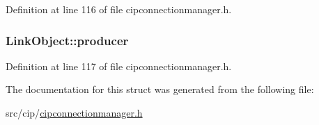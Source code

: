 \-Definition at line 116 of file cipconnectionmanager.\-h.

\hypertarget{structLinkObject_a1fd25d4df3eeff06a5830eac14296bbb}{
\subsubsection[{producer}]{ {\bf \-Link\-Object\-::producer}}}\label{d7/d2d/structLinkObject_a1fd25d4df3eeff06a5830eac14296bbb}


\-Definition at line 117 of file cipconnectionmanager.\-h.



\-The documentation for this struct was generated from the following file\-:\begin{DoxyCompactItemize}
\item 
src/cip/\hyperlink{cipconnectionmanager_8h}{cipconnectionmanager.\-h}\end{DoxyCompactItemize}
